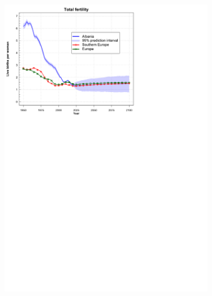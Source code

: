 \begin{figure}[H]
\begin{subfigure}[b]{0.32\textwidth}
        \includegraphics[width=\textwidth]{photos/6-Total fertility.html.pdf}
    \end{subfigure}
    \hfill
    \begin{subfigure}[b]{0.32\textwidth}
        \centering

\end{subfigure}
\end{figure}
